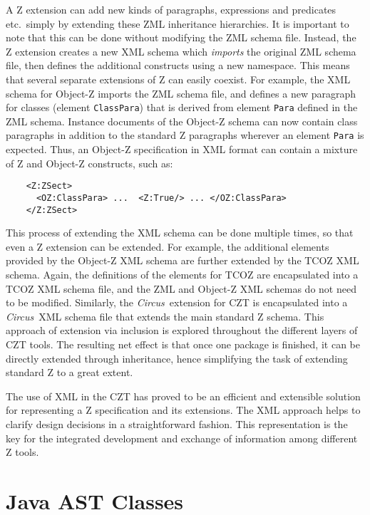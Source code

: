\documentclass{llncs}
\newcommand{\Circus}{{\sf\slshape Circus}}
\newcommand{\Element}[1]{\texttt{#1}}
\begin{document}
  A Z extension can add new kinds of paragraphs, expressions and predicates
  etc.~simply by extending these ZML inheritance hierarchies.  It is
  important to note that this can be done without modifying the
  ZML schema file.  Instead, the Z extension creates a new XML schema
  which \emph{imports} the original ZML schema file, then defines the
  additional constructs using a new namespace.  
  This means that several separate extensions of Z can easily coexist.
  For example, the XML schema for Object-Z imports
  the ZML schema file, and defines a new paragraph for classes (element
  \Element{ClassPara}) that is derived from element \Element{Para}
  defined in the ZML schema.  Instance documents of the Object-Z
  schema can now contain class paragraphs in addition to the standard Z
  paragraphs wherever an element \Element{Para} is expected.  Thus,
  an Object-Z specification in XML format can contain a mixture of
  Z and Object-Z constructs, such as:
\begin{small}
\begin{verbatim}
    <Z:ZSect>
      <OZ:ClassPara> ...  <Z:True/> ... </OZ:ClassPara>
    </Z:ZSect>
\end{verbatim}
\end{small}

  This process of extending the XML schema can be done multiple times, so
  that even a Z extension can be extended.  For example, the
  additional elements provided by the Object-Z XML schema are further
  extended by the TCOZ XML schema.  Again, the definitions of the elements
  for TCOZ are encapsulated into a TCOZ XML schema file, and the ZML and
  Object-Z XML schemas do not need to be modified.
  Similarly, the \Circus\ extension for CZT is encapsulated into a
  \Circus\ XML schema file that extends the main standard Z schema.
  This approach of extension via inclusion is explored throughout the
  different layers of CZT tools.
  The resulting net effect is that once one package is finished, it
  can be directly extended through inheritance, hence simplifying the
  task of extending standard Z to a great extent.

  The use of XML in the CZT has proved to be an efficient and extensible
  solution for representing a Z specification and its extensions.  The
  XML approach helps to clarify design decisions in a straightforward
  fashion.  This representation is the key for the integrated
  development and exchange of information among different Z tools.

\section{Java AST Classes}\label{java-ast-classes}
\end{document}
